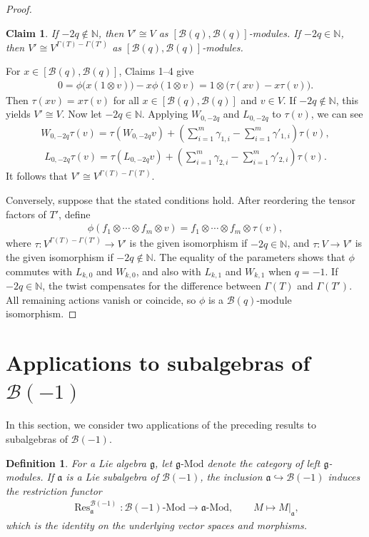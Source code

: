 \documentclass[a4paper]{amsart}
\numberwithin{equation}{section}
\newtheorem{claim}{Claim}
\newtheorem{definition}[theorem]{Definition}
\begin{document}
\begin{proof}
\begin{claim}
If $-2q\notin\mathbb N$, then $V'\cong V$ as $[\mathcal B(q),\mathcal B(q)]$-modules. If
$-2q\in\mathbb N$, then
$V'\cong V^{\Gamma(T)-\Gamma(T')}$ as
$[\mathcal B(q),\mathcal B(q)]$-modules.
\end{claim}
For $x\in[\mathcal B(q),\mathcal B(q)]$, Claims 1--4 give
\begin{align*}
0=\phi\bigl(x(1\otimes v)\bigr)-x\phi(1\otimes v)
=1\otimes\bigl(\tau(xv)-x\tau(v)\bigr).
\end{align*}
Then $\tau(xv)=x\tau(v)$ for all
$x\in[\mathcal B(q),\mathcal B(q)]$ and $v\in V$.
If $-2q\notin\mathbb N$, this yields $V'\cong V$. Now let
$-2q\in\mathbb N$. 
Applying $W_{0,-2q}$ and $L_{0,-2q}$ to $\tau(v)$, we can see
\begin{align*}
W_{0,-2q}\tau(v)
=\tau(W_{0,-2q}v)
+\left(\sum_{i=1}^m\gamma_{1,i}
-\sum_{i=1}^m\gamma'_{1,i}\right)\tau(v),
\end{align*}
\begin{align*}
L_{0,-2q}\tau(v)
=\tau(L_{0,-2q}v)
+\left(\sum_{i=1}^m\gamma_{2,i}
-\sum_{i=1}^m\gamma'_{2,i}\right)\tau(v).
\end{align*}
It follows that $V'\cong V^{\Gamma(T)-\Gamma(T')}$.

Conversely, suppose that the stated conditions hold. After reordering
the tensor factors of $T'$, define
\begin{align*}
\phi(f_1\otimes\cdots\otimes f_m\otimes v)
=f_1\otimes\cdots\otimes f_m\otimes\tau(v),
\end{align*}
where $\tau:V^{\Gamma(T)-\Gamma(T')}\to V'$ is the given isomorphism
if $-2q\in\mathbb N$, and $\tau:V\to V'$ is the given isomorphism
if $-2q\notin\mathbb N$. The equality of the parameters shows that
$\phi$ commutes with $L_{k,0}$ and $W_{k,0}$, and also with
$L_{k,1}$ and $W_{k,1}$ when $q=-1$. If
$-2q\in\mathbb N$, the twist compensates for the difference between
$\Gamma(T)$ and $\Gamma(T')$. All remaining actions vanish or
coincide, so $\phi$ is a $\mathcal B(q)$-module isomorphism.
\end{proof}

\section{Applications to subalgebras of $\mathcal B(-1)$}
In this section, we consider two applications of the preceding results to subalgebras of $\mathcal B(-1)$.
\begin{definition}
For a Lie algebra $\mathfrak g$, let $\mathfrak g\text{-}\mathrm{Mod}$ denote the category of left $\mathfrak g$-modules. If $\mathfrak a$ is a Lie subalgebra of $\mathcal B(-1)$, the inclusion $\mathfrak a\hookrightarrow\mathcal B(-1)$ induces the restriction functor
\begin{align*}
\operatorname{Res}^{\mathcal B(-1)}_{\mathfrak a}:
\mathcal B(-1)\text{-}\mathrm{Mod}\longrightarrow
\mathfrak a\text{-}\mathrm{Mod},
\qquad M\longmapsto M|_{\mathfrak a},
\end{align*}
which is the identity on the underlying vector spaces and morphisms.
\end{definition}
\end{document}
